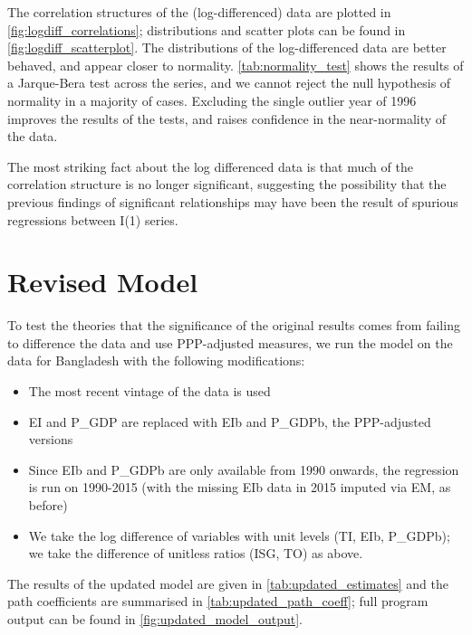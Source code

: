 \documentclass[11pt,a4paper]{article}
\begin{document}
The correlation structures of the (log-differenced) data are plotted in \cref{fig:logdiff_correlations}; distributions and scatter plots can be found in \cref{fig:logdiff_scatterplot}.
The distributions of the log-differenced data are better behaved, and appear closer to normality.
\cref{tab:normality_test} shows the results of a Jarque-Bera test across the series, and we cannot reject the null hypothesis of normality in a majority of cases.
Excluding the single outlier year of 1996 improves the results of the tests, and raises confidence in the near-normality of the data.

The most striking fact about the log differenced data is that much of the correlation structure is no longer significant, suggesting the possibility that the previous findings of significant relationships may have been the result of spurious regressions between I(1) series.

\section{Revised Model}\label{sec:revised_model}

To test the theories that the significance of the original results comes from failing to difference the data and use PPP-adjusted measures, we run the model on the data for Bangladesh with the following modifications:
\begin{itemize}
\item The most recent vintage of the data is used
\item EI and P\_GDP are replaced with EIb and P\_GDPb, the PPP-adjusted versions
\item Since EIb and P\_GDPb are only available from 1990 onwards, the regression is run on 1990-2015 (with the missing EIb data in 2015 imputed via EM, as before)
\item We take the log difference of variables with unit levels (TI, EIb, P\_GDPb); we take the difference of unitless ratios (ISG, TO) as above. 
\end{itemize}

The results of the updated model are given in \cref{tab:updated_estimates} and the path coefficients are summarised in \cref{tab:updated_path_coeff}; full program output can be found in  \cref{fig:updated_model_output}.
\end{document}
